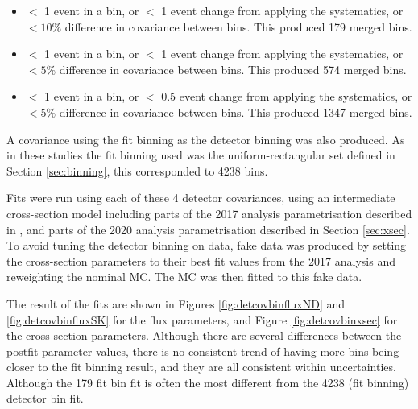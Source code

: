 \begin{itemize}

\item $<$ 1 event in a bin, or $<$ 1 event change from applying the systematics, or $< 10\%$ difference in covariance between bins. This produced 179 merged bins.

\item $<$ 1 event in a bin, or $<$ 1 event change from applying the systematics, or $< 5\%$ difference in covariance between bins. This produced 574 merged bins.

\item $<$ 1 event in a bin, or $<$ 0.5 event change from applying the systematics, or $< 5\%$ difference in covariance between bins. This produced 1347 merged bins.

\end{itemize}

A covariance using the fit binning as the detector binning was also produced. As in these studies the fit binning used was the uniform-rectangular set defined in Section \ref{sec:binning}, this corresponded to 4238 bins.

Fits were run using each of these 4 detector covariances, using an intermediate cross-section model including parts of the 2017 analysis parametrisation described in \cite{tn315}, and parts of the 2020 analysis parametrisation described in Section \ref{sec:xsec}. To avoid tuning the detector binning on data, fake data was produced by setting the cross-section parameters to their best fit values from the 2017 analysis and reweighting the nominal MC. The MC was then fitted to this fake data.

The result of the fits are shown in Figures \ref{fig:detcovbinfluxND} and \ref{fig:detcovbinfluxSK} for the flux parameters, and Figure \ref{fig:detcovbinxsec} for the cross-section parameters. Although there are several differences between the postfit parameter values, there is no consistent trend of having more bins being closer to the fit binning result, and they are all consistent within uncertainties. Although the 179 fit bin fit is often the most different from the 4238 (fit binning) detector bin fit.

